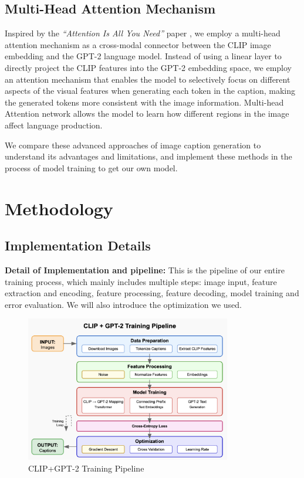 \documentclass[11pt]{article}
\begin{document}
    \subsection{Multi-Head Attention Mechanism}
    Inspired by the \textit{``Attention Is All You Need''} paper 
    \cite{vaswani2017attention}, we employ a multi-head attention 
    mechanism as a cross-modal connector between the CLIP image embedding
    and the GPT-2 language model. Instead of using a linear layer to directly 
    project the CLIP features into the GPT-2 embedding space, we employ an 
    attention mechanism that enables the model to selectively focus on 
    different aspects of the visual features when generating each token 
    in the caption, making the generated tokens more consistent with the 
    image information. Multi-head Attention network allows the model to 
    learn how different regions in the image affect language production.

We compare these advanced approaches of image caption generation to understand its 
advantages and limitations, and implement these methods in the process of model training to get our own model.
\pagebreak
\section{Methodology}

\subsection{Implementation Details}
\textbf{Detail of Implementation and pipeline:} This is the pipeline of 
our entire training process, which mainly includes multiple steps: 
image input, feature extraction and encoding, feature processing, 
feature decoding, model training and error evaluation. We will also 
introduce the optimization we used.

    \begin{figure}[h]
    \centering
    \includegraphics[width=0.8\textwidth]{figure1.png}
    \caption{CLIP+GPT-2 Training Pipeline}
    \label{fig:architecture}
    \end{figure}
\end{document}

